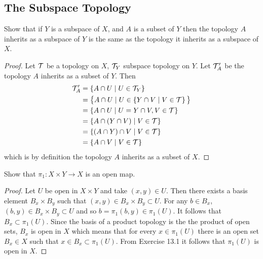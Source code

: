 \subsection{The Subspace Topology}
\begin{ex}{16.1}
    Show that if $Y$ is a subspace of $X$, and $A$ is a subset of $Y$ then the topology $A$ inherits as a subspace of $Y$ is the same as the topology it inherits as a subspace of $X$.
\end{ex}
\begin{proof}
    Let $\mathcal{T}$ be a topology on $X$, $\mathcal{T}_Y$ subspace topology on $Y$. Let $\mathcal{T}_A'$ be the topology $A$ inherits as a subset of $Y$.
    Then
    \begin{align*}
        \mathcal{T}_A'&=\left\{A\cap U\mid U\in\mathcal{T}_Y\right\}\\
        &=\big\{A\cap U\mid U\in\left\{Y\cap V\mid V\in \mathcal{T}\right\} \big\}\\
        &=\left\{A\cap U\mid U= Y\cap V, V\in\mathcal{T}\right\}\\
        &=\left\{A\cap\left(Y\cap V\right)\mid V\in\mathcal{T}\right\}\\
        &=\left\{\left(A\cap Y\right)\cap V\mid V\in\mathcal{T}\right\}\\
        &=\left\{A\cap V\mid V\in\mathcal{T}\right\}    
    \end{align*}
    which is by definition the topology $A$ inherits as a subset of $X$.
\end{proof}

\begin{ex}{16.4}
    Show that $\pi_1:X\times Y\to X$ is an open map.
\end{ex}
\begin{proof}
    Let $U$ be open in $X\times Y$ and take $(x,y)\in U$. Then there exists a basis element $B_x\times B_y$ such that $(x,y)\in B_x\times B_y\subset U$.
    For any $b\in B_x$, $(b,y)\in B_x\times B_y\subset U$ and so $b=\pi_1(b,y)\in \pi_1(U)$. It follows that $B_x\subset\pi_1(U)$.
    Since the basis of a product topology is the the product of open sets, $B_x$ is open in $X$ which means that for every $x\in\pi_1(U)$ there is an open set $B_x\in X$ such that $x\in B_x\subset \pi_1(U)$.
    From Exercise 13.1 it follows that $\pi_1(U)$ is open in $X$.    
\end{proof}